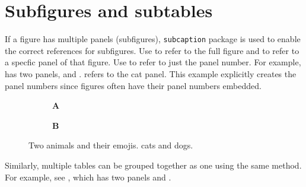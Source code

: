 \section{Subfigures and subtables}
If a figure has multiple panels (subfigures), \texttt{subcaption} package is used to enable the correct references for subfigures.
Use \cmd{\fref} to refer to the full figure and \cmd{\fref} to refer to a specfic panel of that figure.
Use \cmd{\subcaptionref} to refer to just the panel number.
For example,  has two panels,  and .
 refers to the cat panel.
This example explicitly creates the panel numbers since figures often have their panel numbers embedded.

\begin{figure}[t]
    \begin{subfigure}[b]{.5\linewidth}
        \centering
        \textbf{\sffamily A}\\[-0.5\onelineskip]
    \end{subfigure}%
    \begin{subfigure}[b]{.5\linewidth}
        \centering
        \textbf{\sffamily B}\\[-0.5\onelineskip]
    \end{subfigure}
    \caption[Two animals and their emojis.]{%
        Two animals and their emojis.
         cats and  dogs.
    }
    \label{fig:subfigure-demo}
\end{figure}

Similarly, multiple tables can be grouped together as one using the same method.
For example, see , which has two panels  and .

